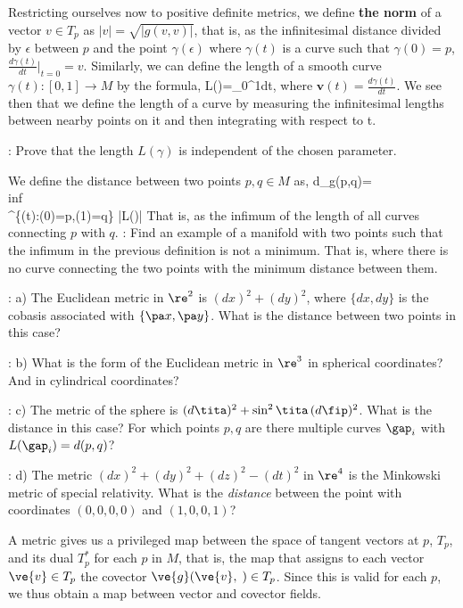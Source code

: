 Restricting ourselves now to positive definite metrics,
we define {\bf the norm} of a vector $v \in T_p$ as
$|v| = \sqrt{|g(v,v)|} $, that is, as the infinitesimal distance divided
by $\epsilon$ between $p$ and the point $\gamma (\epsilon)$ where
$\gamma(t)$ is a curve such that $\gamma (0) = p$, 
$\frac{d\gamma(t)}{dt}|_{t=0} = v$.
Similarly, we can define the length of a smooth curve
$\gamma(t):[0,1] \rightarrow M$ by the formula,
\beq
L(\lap)=\int_0^1\;dt,
\eeq
where $\mathbf{v}(t)=\frac{d\gamma(t)}{dt} $. We see then that we define the
length of a curve by measuring the infinitesimal lengths between nearby points on it and then integrating with respect to t.

\espa
\ejer: Prove that the length $L(\gamma) $ is independent of the chosen parameter.

We define the distance
between two points $p,q \in M$ as,
\beq
d_g(p,q)=\\inf\\^{\{\gamma(t)\;:\;\gamma(0)=p,\gamma(1)=q\}}\earr
|L(\gamma)|
\eeq
That is, as the infimum of the length of all curves connecting
$p$ with $q$.
\espa
\ejer: Find an example of a manifold with two points such that
the infimum in the previous definition is not a minimum. That is,
where there is no curve connecting the two points with the
minimum distance between them.
\espa

\ejer: a) The Euclidean metric in $\re^2$ is $(dx)^2+(dy)^2$, where $\{dx,dy\}$ 
is the cobasis associated
with $\{\pa x,\pa y\}$. What is the distance between two points in this case?

\ejer: b) What is the form of the Euclidean metric in $\re^3$ 
in spherical coordinates? And in cylindrical coordinates?

\ejer: c) The metric of the sphere is
$(d\tita)^2+\sin^2\tita\,(d\fip)^2$. 
What is the distance in this case? For which points $p,q$ are there
multiple curves $\gap_i$ with $L(\gap_i)=d(p,q)$?


\ejer: d) The metric $(dx)^2+(dy)^2+(dz)^2-(dt)^2$ in $\re^4$ is the Minkowski metric of
special relativity. What is the {\it distance} between the point with
coordinates $(0,0,0,0)$ and $(1,0,0,1)$?

A metric gives us a privileged map between the space of
tangent vectors at $p$, $T_p$, and its dual $T_p^*$ for each $p$ in $M$, 
that is, the map
that assigns to each vector $\ve{v}\in T_p$ the covector $\ve{g}(\ve{v},\;)\in T_p$. 
Since this is valid for each $p$, we thus obtain a map between vector
and covector fields.

